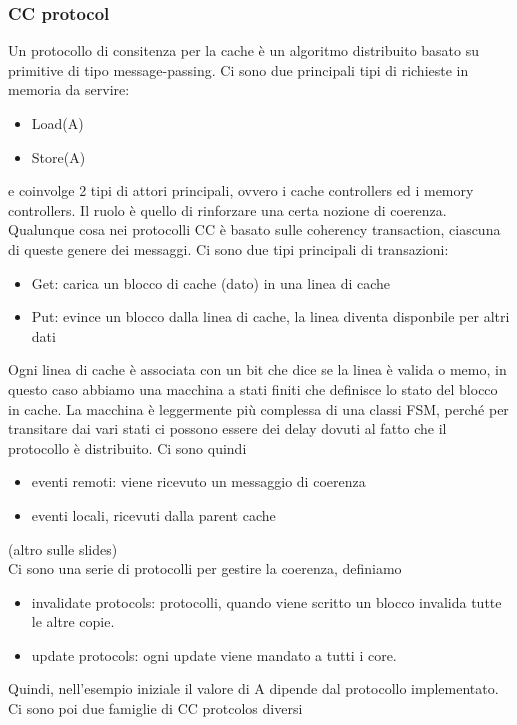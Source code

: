 \documentclass[12pt, oneside]{extbook} %
\begin{document}
\subsubsection{CC protocol}
Un protocollo di consitenza per la cache è un algoritmo distribuito basato su primitive di tipo message-passing. Ci sono due principali tipi di richieste in memoria da servire:
\begin{itemize}
\item Load(A)
\item Store(A)
\end{itemize}
e coinvolge 2 tipi di attori principali, ovvero i cache controllers ed i memory controllers. Il ruolo è quello di rinforzare una certa nozione di coerenza.\\ Qualunque cosa nei protocolli CC è basato sulle coherency transaction, ciascuna di queste genere dei messaggi. Ci sono due tipi principali di transazioni:
\begin{itemize}
\item Get: carica un blocco di cache (dato) in una linea di cache
\item Put: evince un blocco dalla linea di cache, la linea diventa disponbile per altri dati
\end{itemize}
Ogni linea di cache è associata con un bit che dice se la linea è valida o memo, in questo caso abbiamo una macchina a stati finiti che definisce lo stato del blocco in cache. La macchina è leggermente più complessa di una classi FSM, perché per transitare dai vari stati ci possono essere dei delay dovuti al fatto che il protocollo è distribuito. Ci sono quindi
\begin{itemize}
\item eventi remoti: viene ricevuto un messaggio di coerenza
\item eventi locali, ricevuti dalla parent cache
\end{itemize}
(altro sulle slides)\\ Ci sono una serie di protocolli per gestire la coerenza, definiamo
\begin{itemize}
\item invalidate protocols: protocolli, quando viene scritto un blocco invalida tutte le altre copie.
\item update protocols: ogni update viene mandato a tutti i core.
\end{itemize}
Quindi, nell'esempio iniziale il valore di A dipende dal protocollo implementato. Ci sono poi due famiglie di CC protcolos diversi
\end{document}
